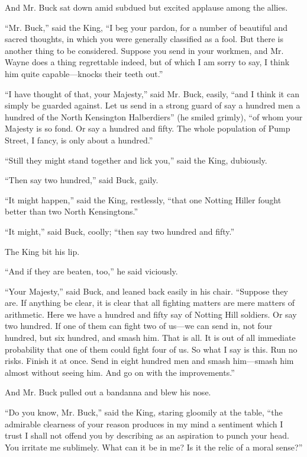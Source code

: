 \documentclass{book}
\begin{document}
And Mr. Buck sat down amid subdued but excited applause among the allies.

“Mr. Buck,” said the King, “I beg your pardon, for a number of beautiful and sacred thoughts, in which you were generally classified as a fool. But there is another thing to be considered. Suppose you send in your workmen, and Mr. Wayne does a thing regrettable indeed, but of which I am sorry to say, I think him quite capable—knocks their teeth out.”

“I have thought of that, your Majesty,” said Mr. Buck, easily, “and I think it can simply be guarded against. Let us send in a strong guard of say a hundred men a hundred of the North Kensington Halberdiers” (he smiled grimly), “of whom your Majesty is so fond. Or say a hundred and fifty. The whole population of Pump Street, I fancy, is only about a hundred.”

“Still they might stand together and lick you,” said the King, dubiously.

“Then say two hundred,” said Buck, gaily.

“It might happen,” said the King, restlessly, “that one Notting Hiller fought better than two North Kensingtons.”

“It might,” said Buck, coolly; “then say two hundred and fifty.”

The King bit his lip.

“And if they are beaten, too,” he said viciously.

“Your Majesty,” said Buck, and leaned back easily in his chair. “Suppose they are. If anything be clear, it is clear that all fighting matters are mere matters of arithmetic. Here we have a hundred and fifty say of Notting Hill soldiers. Or say two hundred. If one of them can fight two of us—we can send in, not four hundred, but six hundred, and smash him. That is all. It is out of all immediate probability that one of them could fight four of us. So what I say is this. Run no risks. Finish it at once. Send in eight hundred men and smash him—smash him almost without seeing him. And go on with the improvements.”

And Mr. Buck pulled out a bandanna and blew his nose.

“Do you know, Mr. Buck,” said the King, staring gloomily at the table, “the admirable clearness of your reason produces in my mind a sentiment which I trust I shall not offend you by describing as an aspiration to punch your head. You irritate me sublimely. What can it be in me? Is it the relic of a moral sense?”
\end{document}
